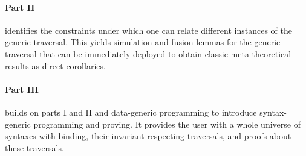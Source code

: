 \paragraph{Part II} identifies the constraints under which one can relate
different instances of the generic traversal. This yields simulation and
fusion lemmas for the generic traversal that can be immediately deployed
to obtain classic meta-theoretical results as direct corollaries.

\paragraph{Part III} builds on parts I and II and data-generic programming
to introduce syntax-generic programming and proving. It provides the user
with a whole universe of syntaxes with binding, their invariant-respecting
traversals, and proofs about these traversals.
